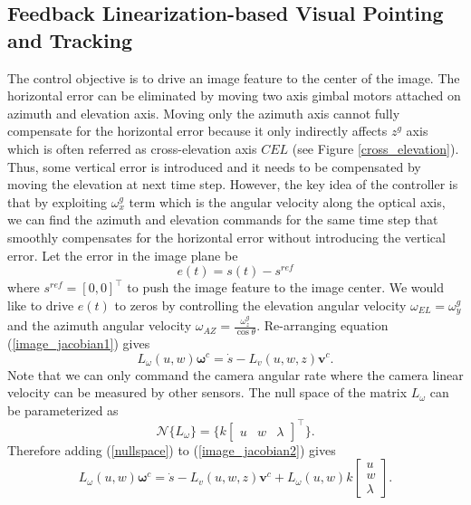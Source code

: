 \subsection{Feedback Linearization-based Visual Pointing and Tracking}
The control objective is to drive an image feature to the center of the image. The horizontal error can be eliminated by moving two axis gimbal motors attached on azimuth and elevation axis. Moving only the azimuth axis cannot fully compensate for the horizontal error because it only indirectly affects $z^g$ axis which is often referred as cross-elevation axis $CEL$ (see Figure \ref{cross_elevation}). Thus, some vertical error is introduced and it needs to be compensated by moving the elevation at next time step. However, the key idea of the controller is that by exploiting $\omega_x^g$ term which is the angular velocity along the optical axis, we can find the azimuth and elevation commands for the same time step that smoothly compensates for the horizontal error without introducing the vertical error. Let the error in the image plane be
\begin{equation}
e(t)=s(t)-s^{ref}
\label{image_feature_error}
\end{equation}
where $s^{ref}=[0, 0]^\top$ to push the image feature to the image center. We would like to drive $e(t)$ to zeros by controlling the elevation angular velocity $\omega_{EL}=\omega_y^g$ and the azimuth angular velocity $\omega_{AZ}=\frac{\omega_z^g}{\cos \theta}$. Re-arranging equation (\ref{image_jacobian1}) gives
\begin{equation}
L_{\omega}(u,w)\mathbf{\omega}^c=\dot{s}-L_v(u,w,z)\mathbf{v}^c.
\label{image_jacobian2}
\end{equation}
Note that we can only command the camera angular rate where the camera linear velocity can be measured by other sensors. The null space of the matrix $L_{\omega}$ can be parameterized as
\begin{equation}
\mathcal{N}\{L_{\omega}\}=\{k\begin{bmatrix}
u & w & \lambda
\end{bmatrix}^\top\}.
\label{nullspace}
\end{equation}
Therefore adding (\ref{nullspace}) to (\ref{image_jacobian2}) gives
\begin{equation}
L_{\omega}(u,w)\mathbf{\omega}^c=\dot{s}-L_v(u,w,z)\mathbf{v}^c+L_{\omega}(u,w)k\begin{bmatrix}
u \\ w \\ \lambda
\end{bmatrix}.
\label{image_jacobian3}
\end{equation}
